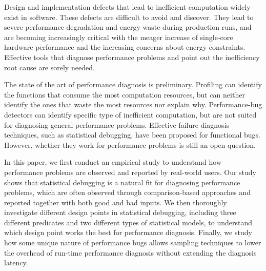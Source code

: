 Design and implementation defects that lead to inefficient computation widely
exist in software. These defects are difficult to avoid and discover.
They lead to severe performance 
degradation and energy waste during production runs, and are becoming 
increasingly critical with the meager increase of 
single-core hardware performance and the increasing concerns about energy
constraints. Effective tools that diagnose performance 
problems and point out the inefficiency root cause 
are sorely needed.

The state of the art of performance diagnosis is preliminary. Profiling
can identify the functions that consume the most computation resources, but can neither identify the ones that waste the most resources nor explain why.
Performance-bug detectors can identify
specific type of inefficient computation, but are not suited for
diagnosing general performance problems. Effective failure
diagnosis techniques, such as statistical debugging, have been proposed for
functional bugs. However, whether they work for
performance problems is still an open question.

In this paper, we first conduct an empirical study to understand how performance
problems are observed and reported by real-world users. Our study shows that
statistical debugging is a natural fit for diagnosing 
performance problems, which
are often observed through comparison-based approaches and
reported together with both good and bad inputs. We then thoroughly investigate
different design points in statistical debugging, including three different
predicates and two different types of statistical models, to understand which
design point works the best for performance diagnosis. Finally, we study how 
some unique nature of performance bugs allows sampling techniques to  
lower the overhead of run-time performance diagnosis without extending the
diagnosis latency.
